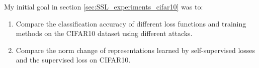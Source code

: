 \documentclass[../thesis.tex]{subfiles}
\begin{document}
My initial goal in section \ref{sec:SSL_experiments_cifar10} was to:
\begin{enumerate}
	\item Compare the classification accuracy of different loss functions and training methods on the CIFAR10\- dataset using different attacks.
	
	\item Compare the norm change of representations learned by self-supervised losses and the supervised loss on \-CIFAR10\-.
	
\end{enumerate}


 
\end{document}
